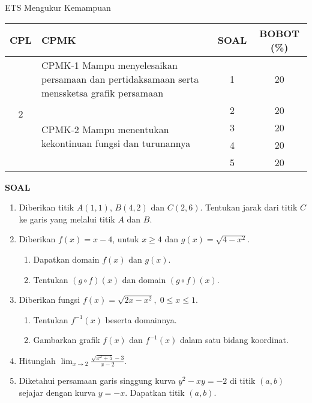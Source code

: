 \documentclass[10pt,openany,a4paper]{article}
\begin{document}
\begin{table}[h]
    \centering
    ETS Mengukur Kemampuan
    \begin{tabular}{|c|m{10.5cm}|c|c|}
        \hline
        CPL & CPMK                                                                                      & SOAL & BOBOT (\%) \\ \hline
        \multirow{5}{*}{2}
            & CPMK-1 Mampu menyelesaikan persamaan dan pertidaksamaan serta menssketsa grafik persamaan & 1    & 20         \\ \cline{2-4}
            & \multirow{4}{*}{CPMK-2 Mampu menentukan kekontinuan fungsi dan turunannya}                & 2    & 20         \\\cline{3-4}
            &                                                                                           & 3    & 20         \\ \cline{3-4}
            &                                                                                           & 4    & 20         \\ \cline{3-4}
            &                                                                                           & 5    & 20         \\ \hline
    \end{tabular}
\end{table}
{\centering\textbf{SOAL}}
\begin{enumerate}
    \item Diberikan titik $A(1,1)$, $B(4,2)$ dan $C(2,6)$. Tentukan jarak dari titik $C$ ke garis yang melalui titik $A$ dan $B$.

    \item Diberikan $f(x) = x - 4$, untuk $x \geq 4$ dan $g(x) = \sqrt{4 - x^2}$.
          \begin{enumerate}
              \item Dapatkan domain $f(x)$ dan $g(x)$.
              \item Tentukan $(g \circ f)(x)$ dan domain $(g \circ f)(x)$.
          \end{enumerate}

    \item Diberikan fungsi $f(x) = \sqrt{2x - x^2}, \; 0 \leq x \leq 1$.
          \begin{enumerate}
              \item Tentukan $f^{-1}(x)$ beserta domainnya.
              \item Gambarkan grafik $f(x)$ dan $f^{-1}(x)$ dalam satu bidang koordinat.
          \end{enumerate}

    \item Hitunglah
          $\displaystyle
              \lim_{x \to 2} \frac{\sqrt{x^2 + 5} - 3}{x - 2}.
          $

    \item Diketahui persamaan garis singgung kurva $y^2 - xy = -2$ di titik $(a,b)$ sejajar dengan kurva $y = -x$.
          Dapatkan titik $(a,b)$.

\end{enumerate}
\end{document}
